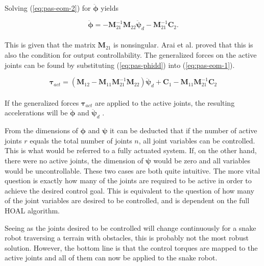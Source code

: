 Solving (\ref{eq:pas-eom-2}) for $\ddot{\boldsymbol{\phi}}$ yields

\begin{equation}\label{eq:pas-phidd}
    \ddot{\boldsymbol{\phi}} = - \mathbf{M}^{-1}_{21}  \mathbf{M}_{22} \ddot{\boldsymbol{\psi}}_d - \mathbf{M}^{-1}_{21} \mathbf{C}_2.
\end{equation}
\\
This is given that the matrix $\mathbf{M}_{21}$ is nonsingular. Arai et al. proved that this is also the condition for output controllability.
The generalized forces on the active joints can be found by substituting (\ref{eq:pas-phidd}) into (\ref{eq:pas-eom-1}).

\begin{equation}
    \boldsymbol{\tau}_{act} = (\mathbf{M}_{12} - \mathbf{M}_{11} \mathbf{M}^{-1}_{21} \mathbf{M}_{22})\ddot{\boldsymbol{\psi}}_d + \mathbf{C}_1 - \mathbf{M}_{11} \mathbf{M}^{-1}_{21} \mathbf{C}_2
\end{equation}
\\
If the generalized forces $\boldsymbol{\tau}_{act}$ are applied to the active joints, the resulting accelerations will be $\ddot{\boldsymbol{\phi}}$ and $\ddot{\boldsymbol{\psi}}_d$ \cite{arai1991position}.

From the dimensions of $\boldsymbol{\phi}$ and $\boldsymbol{\psi}$ it can be deducted that if the number of active joints $r$ equals the total number of joints $n$, all joint variables can be controlled. This is what would be referred to a fully actuated system. If, on the other hand, there were no active joints, the dimension of $\boldsymbol{\psi}$ would be zero and all variables would be uncontrollable. These two cases are both quite intuitive. The more vital question is exactly how many of the joints are required to be active in order to achieve the desired control goal. This is equivalent to the question of how many of the joint variables are desired to be controlled, and is dependent on the full HOAL algorithm.

Seeing as the joints desired to be controlled will change continuously for a snake robot traversing a terrain with obstacles, this is probably not the most robust solution. However, the bottom line is that the control torques are mapped to the active joints and all of them can now be applied to the snake robot.
